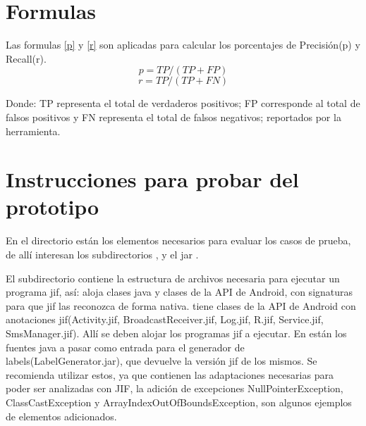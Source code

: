 \section{Formulas}
Las formulas \ref{p} y \ref{r} son aplicadas para calcular los porcentajes
de Precisión(p) y Recall(r).
\begin{equation}
\label{p}
	p = TP/(TP +FP) 
\end{equation}
\begin{equation}
\label{r}
	r = TP/(TP+FN)
\end{equation}

Donde: \newline
TP representa el total de verdaderos positivos; FP corresponde al total de
falsos positivos y  FN representa el total de falsos
negativos; reportados por la herramienta.\newline

\section{Instrucciones para probar del prototipo}
En el directorio \small{} están los elementos
necesarios para evaluar los casos de prueba, de allí interesan los
subdirectorios \small{},
\small{} y el jar
\small{}.

El subdirectorio \small{} contiene la estructura de
archivos necesaria para ejecutar un programa jif, así:
\small{} aloja clases java y clases de la API de Android, con
signaturas para que jif las reconozca de forma nativa.
\small{} tiene clases de la API de Android con
anotaciones jif(Activity.jif, BroadcastReceiver.jif, Log.jif, R.jif,
Service.jif, SmsManager.jif). Allí se deben alojar los programas jif a
ejecutar.\newline 
En {\small{}} están los fuentes java a pasar como
entrada para el generador de labels(LabelGenerator.jar), que devuelve la
versión jif de los mismos. Se recomienda utilizar estos, ya que contienen las
adaptaciones necesarias para poder ser analizadas con JIF, la adición de
excepciones NullPointerException, ClassCastException y
ArrayIndexOutOfBoundsException, son algunos ejemplos de elementos adicionados.

